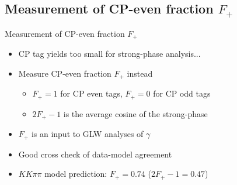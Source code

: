 \documentclass{beamer}
\begin{document}
\subsection{Measurement of CP-even fraction \texorpdfstring{$F_+$}{F+}}

\begin{frame}{Measurement of CP-even fraction $F_+$}
  \begin{itemize}
    \setlength\itemsep{1.0em}
    \item{CP tag yields too small for strong-phase analysis...}
    \item{Measure CP-even fraction $F_+$ instead}
    \begin{itemize}
      \setlength\itemsep{1.0em}
      \item{$F_+ = 1$ for CP even tags, $F_+ = 0$ for CP odd tags}
      \item{$2F_+ - 1$ is the average cosine of the strong-phase}
    \end{itemize}
    \item{$F_+$ is an input to GLW analyses of $\gamma$}
    \item{Good cross check of data-model agreement}
    \item{$KK\pi\pi$ model prediction: $F_+ = 0.74$ ($2F_+ - 1 = 0.47$)}
  \end{itemize}
\end{frame}
\end{document}
